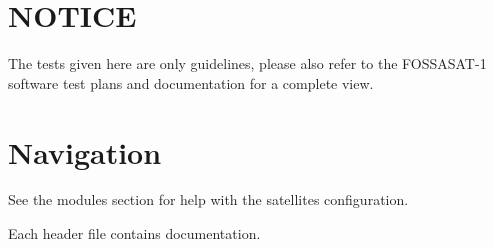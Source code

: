 \section*{N\+O\+T\+I\+CE}

The tests given here are only guidelines, please also refer to the F\+O\+S\+S\+A\+S\+A\+T-\/1 software test plans and documentation for a complete view.

\section*{Navigation}


\begin{DoxyItemize}
\item See the modules section for help with the satellite\textquotesingle{}s configuration.
\item Each header file contains documentation. 
\end{DoxyItemize}